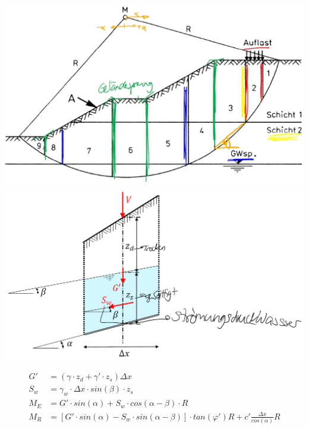 	\begin{minipage}{0.25\linewidth}
		\includegraphics[width=\linewidth]{images/Boschstab1Lamelle.jpg} \\
		\includegraphics[width=\linewidth]{images/Boschstab2Krafte.PNG} \\
	\end{minipage}
\begin{minipage}{\linewidth}
	
	\begin{align*}		
		G' 	&= ( \gamma \cdot z_d + \gamma' \cdot z_s ) \Delta x  \\
		S_w	&= \gamma_w \cdot \Delta x \cdot sin(\beta) \cdot z_s \\
		M_E	&= G' \cdot sin(\alpha) + S_w \cdot cos(\alpha - \beta) \cdot R \\
		M_R	&= [G' \cdot sin(\alpha) - S_w \cdot sin(\alpha - \beta) ] \cdot tan(\varphi')R + c' \frac{\Delta x}{cos(\alpha)} R
	\end{align*}

\end{minipage}
